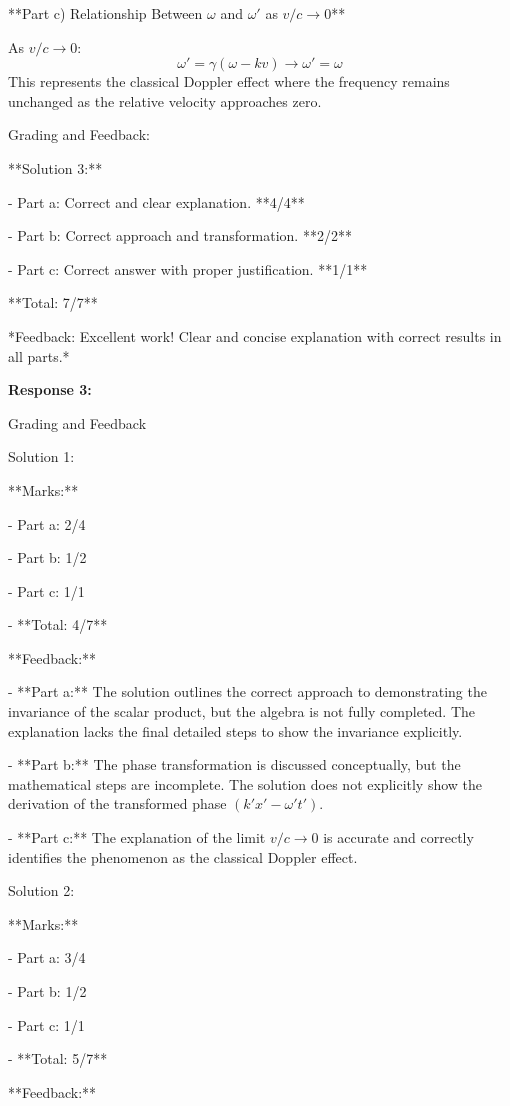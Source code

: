 \documentclass[a4paper,11pt]{article}
\begin{document}
**Part c) Relationship Between \( \omega \) and \( \omega' \) as \( v/c \rightarrow 0 \)**

As \( v/c \rightarrow 0 \):
\[
\omega' = \gamma(\omega - kv) \rightarrow \omega' = \omega
\]
This represents the classical Doppler effect where the frequency remains unchanged as the relative velocity approaches zero.

Grading and Feedback:

**Solution 3:**

- Part a: Correct and clear explanation. **4/4**

- Part b: Correct approach and transformation. **2/2**

- Part c: Correct answer with proper justification. **1/1**

**Total: 7/7**

*Feedback: Excellent work! Clear and concise explanation with correct results in all parts.*

\bigskip
\textbf{Response 3:}

Grading and Feedback

Solution 1:

**Marks:**

- Part a: 2/4

- Part b: 1/2

- Part c: 1/1

- **Total: 4/7**

**Feedback:**

- **Part a:** The solution outlines the correct approach to demonstrating the invariance of the scalar product, but the algebra is not fully completed. The explanation lacks the final detailed steps to show the invariance explicitly.

- **Part b:** The phase transformation is discussed conceptually, but the mathematical steps are incomplete. The solution does not explicitly show the derivation of the transformed phase \( (k'x' - \omega' t') \).

- **Part c:** The explanation of the limit \( v/c \rightarrow 0 \) is accurate and correctly identifies the phenomenon as the classical Doppler effect.

Solution 2:

**Marks:**

- Part a: 3/4

- Part b: 1/2

- Part c: 1/1

- **Total: 5/7**

**Feedback:**
\end{document}
